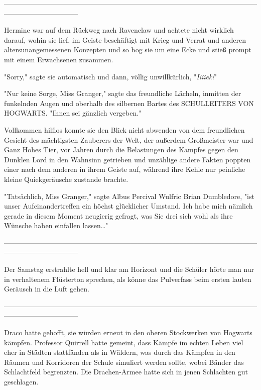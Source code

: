 {--------------------------------------------------------------------------------------------------------------------------------------------

Hermine war auf dem Rückweg nach Ravenclaw und achtete nicht wirklich darauf, wohin sie lief, im Geiste beschäftigt mit Krieg und Verrat und anderen altersunangemessenen Konzepten und so bog sie um eine Ecke und stieß prompt mit einem Erwachsenen zusammen.

"Sorry," sagte sie automatisch und dann, völlig unwillkürlich, "\emph{Iiiiek!}"

"Nur keine Sorge, Miss Granger," sagte das freundliche Lächeln, inmitten der funkelnden Augen und oberhalb des silbernen Bartes des SCHULLEITERS VON HOGWARTS. "Ihnen sei gänzlich vergeben."

Vollkommen hilflos konnte sie den Blick nicht abwenden von dem freundlichen Gesicht des mächtigsten Zauberers der Welt, der außerdem Großmeister war und Ganz Hohes Tier, vor Jahren durch die Belastungen des Kampfes gegen den Dunklen Lord in den Wahnsinn getrieben und unzählige andere Fakten poppten einer nach dem anderen in ihrem Geiste auf, während ihre Kehle nur peinliche kleine Quiekgeräusche zustande brachte.

"Tatsächlich, Miss Granger," sagte Albus Percival Wulfric Brian Dumbledore, "ist unser Aufeinandertreffen ein höchst glücklicher Umstand. Ich habe mich nämlich gerade in diesem Moment neugierig gefragt, was Sie drei sich wohl als ihre Wünsche haben einfallen lassen…"

--------------------------------------------------------------------------------------------------------------------------------------------

Der Samstag erstrahlte hell und klar am Horizont und die Schüler hörte man nur in verhaltenem Flüsterton sprechen, als könne das Pulverfass beim ersten lauten Geräusch in die Luft gehen.

--------------------------------------------------------------------------------------------------------------------------------------------

Draco hatte gehofft, sie würden erneut in den oberen Stockwerken von Hogwarts kämpfen. Professor Quirrell hatte gemeint, dass Kämpfe im echten Leben viel eher in Städten stattfänden als in Wäldern, was durch das Kämpfen in den Räumen und Korridoren der Schule simuliert werden sollte, wobei Bänder das Schlachtfeld begrenzten. Die Drachen-Armee hatte sich in jenen Schlachten gut geschlagen.

}

